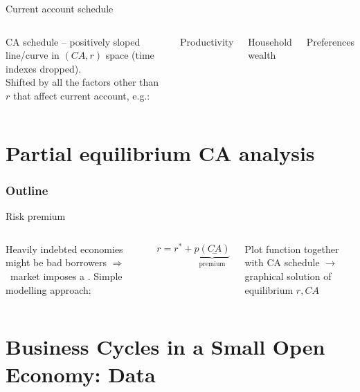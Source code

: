 \documentclass{beamer}
\newcommand{\tb}[1]{{\color{blue}{\textbf{#1}}}}
\newenvironment{mytemize}
{\vfill\itemize[nolistsep,itemsep=\fill,label=\color{blue}{$\triangleright$}]}
  {\enditemize}
\newcommand{\rarr}{$\Rightarrow$\ }
\begin{document}
\begin{frame}{Current account schedule}
  \begin{columns}
	 CA schedule -- positively sloped line/curve in $(CA, r)$ space (time indexes dropped).\\
	\vfill
  Shifted by all the factors other than $r$ that affect current account, e.g.:
  \begin{mytemize}
	\item Productivity 
	\item Household wealth 
	\item Preferences
  \end{mytemize}
  \end{columns}
  \end{frame}

\section{Partial equilibrium CA analysis} 
\begin{frame}
\frametitle{Outline}
\tableofcontents[currentsection]
\end{frame}

\begin{frame}{Risk premium}
  \begin{columns}
	Heavily indebted economies might be bad borrowers \rarr market imposes a \tb{risk premium}. Simple modelling approach: 

	$$r = r^* + \underbrace{p(\underset{-}{CA})}_{\text{premium}}$$
  
  Plot function together with CA schedule $\rightarrow$ graphical solution of equilibrium $r, CA$
  \end{columns}
\end{frame}


\section{Business Cycles in a Small Open Economy: Data}
\end{document}
